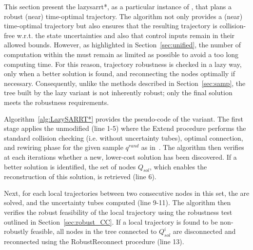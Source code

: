 This section present the \gls{lazysarrt*}, as a particular instance of , that plans a robust (near) time-optimal trajectory.
The algorithm not only provides a (near) time-optimal trajectory but also ensures that the resulting trajectory is collision-free w.r.t. the state uncertainties and also that control inputs remain in their allowed bounds.
However, as highlighted in Section~\ref{sec:unified}, the number of  computation within the  must remain as limited as possible to avoid a too long computing time. 
For this reason, trajectory robustness is checked in a lazy way, only when a better solution is found, and reconnecting the nodes optimally if necessary.
Consequently, unlike the  methods described in Section~\ref{sec:samp}, the tree built by the lazy variant is not inherently robust; only the final solution meets the robustness requirements.

Algorithm~\ref{alg:LazySARRT*} provides the pseudo-code of the  variant.  
The first stage applies the unmodified  (line 1-5) where the Extend procedure performs the standard collision checking (i.e. without uncertainty tubes), optimal connection, and rewiring phase for the given sample  $q^{rand}$ as in~\cite{cRRTstar}.
The algorithm then verifies at each iterations whether a new, lower-cost solution has been discovered. 
If a better solution is identified, the set of nodes $Q_{sol}$, which enables the reconstruction of this solution, is retrieved (line 6).

Next, for each local trajectories between two consecutive nodes in this set, the  are solved, and the uncertainty tubes computed (line 9-11).
The algorithm then verifies the robust feasibility of the local trajectory using the robustness test outlined in Section~\ref{sec:robust_CC}. 
If a local trajectory is found to be non-robustly feasible, all nodes in the tree connected to $Q_{sol}^i$ are disconnected and reconnected using the RobustReconnect procedure (line 13).

